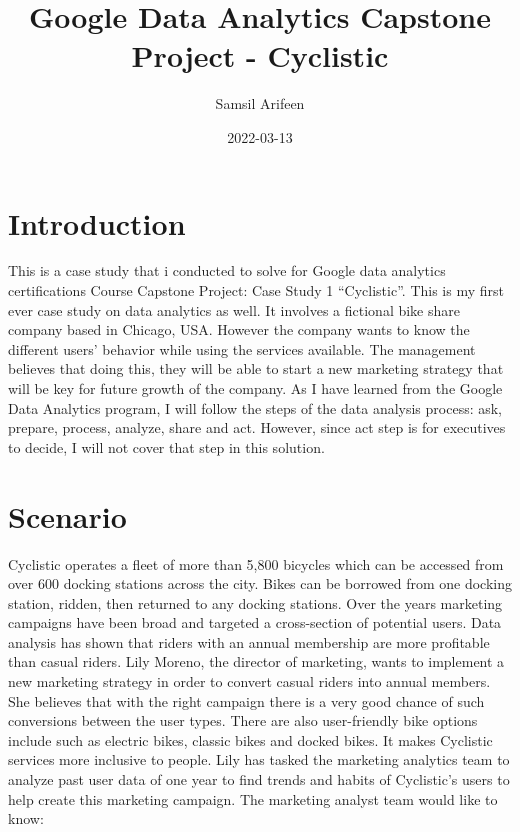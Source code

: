 \documentclass[
]{article}
\title{Google Data Analytics Capstone Project - Cyclistic}
\author{Samsil Arifeen}
\date{2022-03-13}
\begin{document}
\maketitle

\hypertarget{introduction}{%
\section{\texorpdfstring{\textbf{Introduction}}{Introduction}}\label{introduction}}

This is a case study that i conducted to solve for Google data analytics
certifications Course Capstone Project: Case Study 1 ``Cyclistic''. This
is my first ever case study on data analytics as well. It involves a
fictional bike share company based in Chicago, USA. However the company
wants to know the different users' behavior while using the services
available. The management believes that doing this, they will be able to
start a new marketing strategy that will be key for future growth of the
company. As I have learned from the Google Data Analytics program, I
will follow the steps of the data analysis process: ask, prepare,
process, analyze, share and act. However, since act step is for
executives to decide, I will not cover that step in this solution.

\hypertarget{scenario}{%
\section{\texorpdfstring{\textbf{Scenario}}{Scenario}}\label{scenario}}

Cyclistic operates a fleet of more than 5,800 bicycles which can be
accessed from over 600 docking stations across the city. Bikes can be
borrowed from one docking station, ridden, then returned to any docking
stations. Over the years marketing campaigns have been broad and
targeted a cross-section of potential users. Data analysis has shown
that riders with an annual membership are more profitable than casual
riders. Lily Moreno, the director of marketing, wants to implement a new
marketing strategy in order to convert casual riders into annual
members. She believes that with the right campaign there is a very good
chance of such conversions between the user types. There are also
user-friendly bike options include such as electric bikes, classic bikes
and docked bikes. It makes Cyclistic services more inclusive to people.
Lily has tasked the marketing analytics team to analyze past user data
of one year to find trends and habits of Cyclistic's users to help
create this marketing campaign. The marketing analyst team would like to
know:
\end{document}

